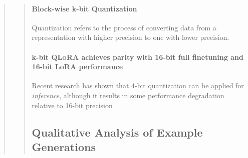 \begin{quote}
\begin{quote}
\paragraph{Block-wise k-bit Quantization} Quantization refers to the process of converting data from a representation with higher precision to one with lower precision. \paragraph{k-bit \textsc{QLoRA} achieves parity with 16-bit full finetuning and 16-bit LoRA performance} Recent research has shown that 4-bit quantization can be applied for \emph{inference}, although it results in some performance degradation relative to 16-bit precision \citep{dettmers2022case,frantar2022gptq}. \subsection{Qualitative Analysis of Example Generations}
\label{ssec:examples}


\end{quote}
\end{quote}
